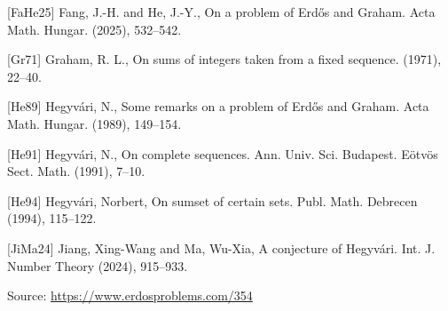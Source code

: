 \documentclass{article}
\begin{document}
[FaHe25] Fang, J.-H. and He, J.-Y., On a problem of {E}rd\H{o}s and {G}raham. Acta Math. Hungar. (2025), 532--542.
 
 [Gr71] Graham, R. L., On sums of integers taken from a fixed sequence. (1971), 22--40.
 
 [He89] Hegyv\'{a}ri, N., Some remarks on a problem of {E}rd\H{o}s and {G}raham. Acta Math. Hungar. (1989), 149--154.
 
 [He91] Hegyv\'{a}ri, N., On complete sequences. Ann. Univ. Sci. Budapest. E\"otv\"os Sect. Math. (1991), 7--10.
 
 [He94] Hegyv\'{a}ri, Norbert, On sumset of certain sets. Publ. Math. Debrecen (1994), 115--122.
 
 [JiMa24] Jiang, Xing-Wang and Ma, Wu-Xia, A conjecture of {H}egyv\'{a}ri. Int. J. Number Theory (2024), 915--933.

\bigskip
\noindent\small{Source: \url{https://www.erdosproblems.com/354}}
\end{document}
